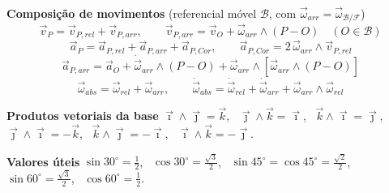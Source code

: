 \documentclass[11pt]{article}
\newcommand{\vi}{\vec{\imath}}
\newcommand{\vj}{\vec{\jmath}}
\newcommand{\vk}{\vec{k}}
\begin{document}
\textbf{Composição de movimentos} \hfill (referencial móvel $\mathcal B$, com $\vec\omega_{arr} = \vec\omega_{\mathcal B/\mathcal F}$)
\[ \vec v_P = \vec v_{P,rel} + \vec v_{P,arr}, \qquad \vec v_{P,arr} = \vec v_O + \vec\omega_{arr} \wedge (P - O)
   \quad (O \in \mathcal B) \]
\[ \vec a_P = \vec a_{P,rel} + \vec a_{P,arr} + \vec a_{P,Cor}, \qquad
   \vec a_{P,Cor} = 2\,\vec\omega_{arr} \wedge \vec v_{P,rel} \]
\[ \vec a_{P,arr} = \vec a_O + \dot{\vec\omega}_{arr} \wedge (P - O) + \vec\omega_{arr} \wedge [\vec\omega_{arr} \wedge (P - O)] \]
\[ \vec\omega_{abs} = \vec\omega_{rel} + \vec\omega_{arr}, \qquad
   \dot{\vec\omega}_{abs} = \dot{\vec\omega}_{rel} + \dot{\vec\omega}_{arr} + \vec\omega_{arr} \wedge \vec\omega_{rel} \]

\textbf{Produtos vetoriais da base} \quad
$\vi \wedge \vj = \vk$, \ $\vj \wedge \vk = \vi$, \ $\vk \wedge \vi = \vj$, \
$\vj \wedge \vi = -\vk$, \ $\vk \wedge \vj = -\vi$, \ $\vi \wedge \vk = -\vj$.

\textbf{Valores úteis} \quad
$\sin 30^\circ = \tfrac12$, \ $\cos 30^\circ = \tfrac{\sqrt3}{2}$, \
$\sin 45^\circ = \cos 45^\circ = \tfrac{\sqrt2}{2}$, \ $\sin 60^\circ = \tfrac{\sqrt3}{2}$, \ $\cos 60^\circ = \tfrac12$.
\end{document}
